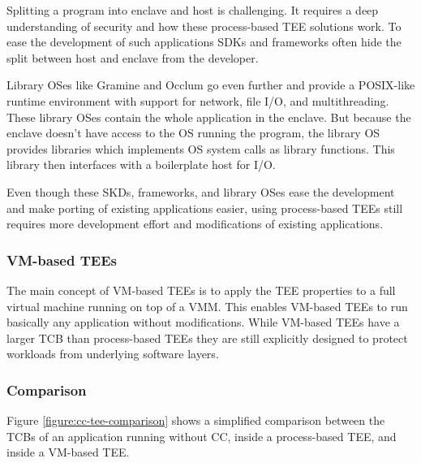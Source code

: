 
Splitting a program into enclave and host is challenging. It requires a deep
understanding of security and how these process-based TEE solutions work. To
ease the development of such applications SDKs and frameworks often hide the
split between host and enclave from the developer\cite{schuster2022}.

Library OSes like Gramine and Occlum go even further and provide a POSIX-like
runtime environment with support for network, file I/O, and multithreading.
These library OSes contain the whole application in the enclave. But because the
enclave doesn't have access to the OS running the program, the library OS
provides libraries which implements OS system calls as library functions. This
library then interfaces with a boilerplate host for I/O\cite{tsai2014}.

Even though these SKDs, frameworks, and library OSes ease the development and
make porting of existing applications easier, using process-based TEEs still
requires more development effort and modifications of existing applications.


\subsubsection{VM-based TEEs}

The main concept of VM-based TEEs is to apply the TEE properties to a full
virtual machine running on top of a VMM. This enables VM-based TEEs to run
basically any application without modifications. While VM-based TEEs have a
larger TCB than process-based TEEs they are still explicitly designed to protect
workloads from underlying software layers.


\subsubsection{Comparison}

Figure \ref{figure:cc-tee-comparison} shows a simplified comparison between the
TCBs of an application running without CC, inside a process-based TEE, and
inside a VM-based TEE.

